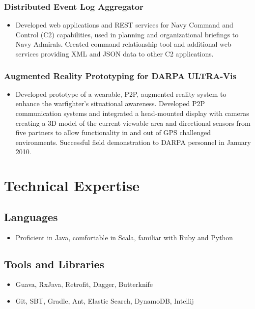 \documentclass[11pt]{article}
\begin{document}
\subsubsection*{Distributed Event Log Aggregator}
\label{sec-1-5-2}

\begin{itemize}
\item Developed web applications and REST services for Navy Command and Control (C2) capabilities, used in planning and organizational briefings to Navy Admirals. Created command relationship tool and additional web services providing XML and JSON data to other C2 applications.
\end{itemize}
\subsubsection*{Augmented Reality Prototyping for DARPA ULTRA-Vis}
\label{sec-1-5-3}

\begin{itemize}
\item Developed prototype of a wearable, P2P, augmented reality system to enhance the warfighter's situational awareness. Developed P2P communication systems and integrated a head-mounted display with cameras creating a 3D model of the current viewable area and directional sensors from five partners to allow functionality in and out of GPS challenged environments. Successful field demonstration to DARPA personnel in January 2010.
\end{itemize}
\section*{Technical Expertise}
\label{sec-2}
\subsection*{Languages}
\label{sec-2-1}

\begin{itemize}
\item Proficient in Java, comfortable in Scala, familiar with Ruby and Python
\end{itemize}
\subsection*{Tools and Libraries}
\label{sec-2-2}

\begin{itemize}
\item Guava, RxJava, Retrofit, Dagger, Butterknife
\item Git, SBT, Gradle, Ant, Elastic Search, DynamoDB, Intellij
\end{itemize}
\end{document}
